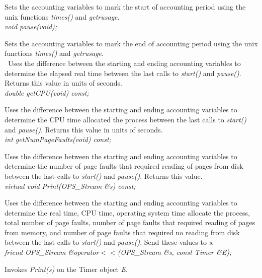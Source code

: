 Sets the accounting variables to mark the start of accounting period
using the unix functions {\em times()} and {\em getrusage}.\\

{\em  void pause(void);}

Sets the accounting variables to mark the end of accounting period
using the unix functions {\em times()} and {\em getrusage}.\\


\
Uses the difference between the starting and ending accounting
variables to determine the elapsed real time between the last calls to
{\em start()} and {\em pause()}. Returns this value in units of seconds.\\

{\em  double getCPU(void) const;}

Uses the difference between the starting and ending accounting
variables to determine the CPU time allocated the process between the
last calls to {\em start()} and {\em pause()}. Returns this value in
units of seconds.\\

{\em  int getNumPageFaults(void) const;}

Uses the difference between the starting and ending accounting
variables to determine the number of page faults that required reading
of pages from disk between the last calls to {\em start()} and {\em
pause()}. Returns this value. \\


{\em virtual void Print(OPS_Stream \&s) const; }

Uses the difference between the starting and ending accounting
variables to determine the real time, CPU time, operating system time
allocate the process, total number of page faults, number of page
faults that required reading of pages from memory, and number of page
faults that required no reading from disk between the last calls to
{\em start()} and {\em pause()}. Send these values to {\em s}. \\

{\em friend OPS_Stream \&operator$<<$(OPS_Stream \&s, const Timer \&E); }

Invokes {\em Print(s)} on the Timer object {\em E}. 


